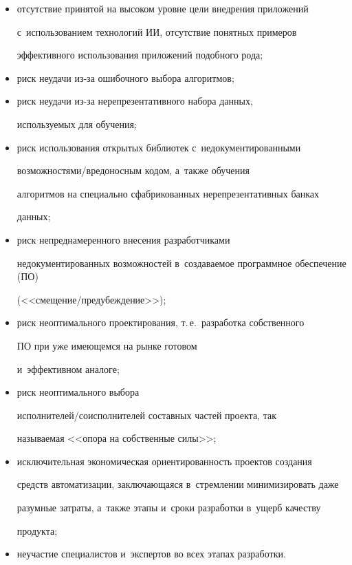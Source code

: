 \begin{itemize}

\item отсутствие принятой на высоком уровне цели внедрения приложений 

с~использованием технологий ИИ, отсутствие понятных примеров 

эффективного использования приложений подобного рода;

\item риск неудачи из-за ошибочного выбора алгоритмов;

\item риск неудачи из-за нерепрезентативного набора данных, 

используемых для обучения;

\item риск использования открытых библиотек с~недокументированными  

воз\-мож\-но\-стя\-ми\!/\!вре\-до\-нос\-ным кодом, а~также обучения 

алгоритмов на специально сфабрикованных нерепрезентативных банках 

данных;

\item риск непреднамеренного внесения разработчиками 

недокументированных возможностей в~создаваемое программное обеспечение (ПО)  

(<<сме\-ще\-ние\!/\!предубеж\-де\-ние>>);

\item риск неоптимального проектирования, т.\,е.\ разработка собственного 

ПО при уже имеющемся на рынке готовом 

и~эффективном аналоге;

\item риск неоптимального выбора  

ис\-пол\-ни\-те\-лей\!/\!со\-ис\-пол\-ни\-те\-лей составных частей проекта, так 

называемая <<опора на собственные силы>>;

\item исключительная экономическая ориентированность проектов создания 

средств автоматизации, заключающаяся в~стремлении минимизировать даже 

разумные затраты, а~также этапы и~сроки разработки в~ущерб качеству 

продукта;

\item неучастие специалистов и~экспертов во всех этапах разработки.

\end{itemize}



